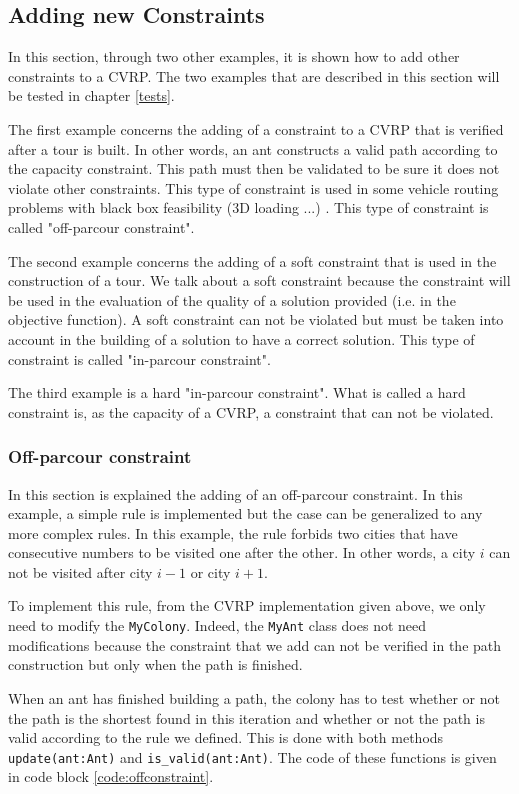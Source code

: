 \subsection{Adding new Constraints}
In this section, through two other examples, it is shown how to add other constraints to a CVRP. The two examples that are described in this section will be tested in chapter \ref{tests}. 

The first example concerns the adding of a constraint to a CVRP that is verified after a tour is built. In other words, an ant constructs a valid path according to the capacity constraint. This path must then be validated to be sure it does not violate other constraints. This type of constraint is used in some vehicle routing problems with black box feasibility (3D loading ...) \cite{massen2013vrp}. This type of constraint is called "off-parcour constraint".

The second example concerns the adding of a soft constraint that is used in the construction of a tour. We talk about a soft constraint because the constraint will be used in the evaluation of the quality of a solution provided (i.e. in the objective function). A soft constraint can not be violated but must be taken into account in the building of a solution to have a correct solution. This type of constraint is called "in-parcour constraint".

The third example is a hard "in-parcour constraint". What is called a hard constraint is, as the capacity of a CVRP, a constraint that can not be violated.

\subsubsection{Off-parcour constraint}
	In this section is explained the adding of an off-parcour constraint. In this example, a simple rule is implemented but the case can be generalized to any more complex rules. In this example, the rule forbids two cities that have consecutive numbers to be visited one after the other. In other words, a city $i$ can not be visited after city $i-1$ or city $i+1$.
	
	To implement this rule, from the CVRP implementation given above, we only need to modify the \texttt{MyColony}. Indeed, the \texttt{MyAnt} class does not need modifications because the constraint that we add can not be verified in the path construction but only when the path is finished. 
	
	When an ant has finished building a path, the colony has to test whether or not the path is the shortest found in this iteration and whether or not the path is valid according to the rule we defined. This is done with both methods \texttt{update(ant:Ant)} and \texttt{is\_valid(ant:Ant)}. The code of these functions is given in code block \ref{code:offconstraint}.
	
